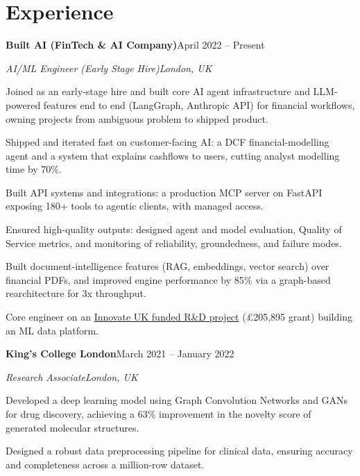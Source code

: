 \documentclass[10pt,a4paper]{article}
\newcommand{\entry}[4]{%
  {\color{company}\bfseries #1}\hfill {\color{muted}#2}\par
  \vspace{1pt}
  {\itshape #3}\hfill {\color{muted}\itshape #4}\par
  \vspace{3pt}%
}
\begin{document}
\section{Experience}
\entry{Built AI (FinTech \& AI Company)}{April 2022 -- Present}{AI/ML Engineer (Early Stage Hire)}{London, UK}
\begin{tight}
  \item Joined as an early-stage hire and built core AI agent infrastructure and LLM-powered features end to end (LangGraph, Anthropic API) for financial workflows, owning projects from ambiguous problem to shipped product.
  \item Shipped and iterated fast on customer-facing AI: a DCF financial-modelling agent and a system that explains cashflows to users, cutting analyst modelling time by 70\%.
  \item Built API systems and integrations: a production MCP server on FastAPI exposing 180+ tools to agentic clients, with managed access.
  \item Ensured high-quality outputs: designed agent and model evaluation, Quality of Service metrics, and monitoring of reliability, groundedness, and failure modes.
  \item Built document-intelligence features (RAG, embeddings, vector search) over financial PDFs, and improved engine performance by 85\% via a graph-based rearchitecture for 3x throughput.
  \item Core engineer on an \href{https://gtr.ukri.org/projects?ref=10022996}{Innovate UK funded R\&D project} (\pounds205,895 grant) building an ML data platform.
\end{tight}

\entry{King's College London}{March 2021 -- January 2022}{Research Associate}{London, UK}
\begin{tight}
  \item Developed a deep learning model using Graph Convolution Networks and GANs for drug discovery, achieving a 63\% improvement in the novelty score of generated molecular structures.
  \item Designed a robust data preprocessing pipeline for clinical data, ensuring accuracy and completeness across a million-row dataset.
\end{tight}

\end{document}
